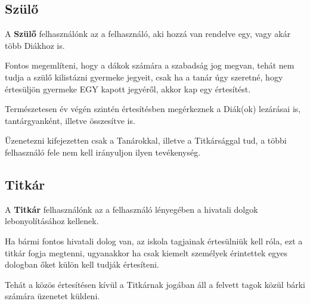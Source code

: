 \newpage
\subsection{Szülő}\label{subsec:RESZLETESLEIRAS:cel:szulo}
A {\bf Szülő} felhasználónk az a felhasználó, aki hozzá van rendelve egy, vagy akár több Diákhoz is.

Fontos megemlíteni, hogy a dákok számára a szabadság jog megvan, tehát nem tudja a szülő kilistázni gyermeke jegyeit, csak ha a tanár úgy szeretné, hogy értesüljön gyermeke EGY kapott jegyéről, akkor kap egy értesítést.

Természetesen év végén szintén értesítésben megérkeznek a Diák(ok) lezárásai is, tantárgyanként, illetve összesítve is.

Üzenetezni kifejezetten csak a Tanárokkal, illetve a Titkársággal tud, a többi felhasználó fele nem kell irányuljon ilyen tevékenység.

\subsection{Titkár}\label{subsec:RESZLETESLEIRAS:cel:titkar}
A {\bf Titkár} felhasználónk az a felhasználó lényegében a hivatali dolgok lebonyolításához kellenek.

Ha bármi fontos hivatali dolog van, az iskola tagjainak értesülniük kell róla, ezt a titkár fogja megtenni, ugyanakkor ha csak kiemelt személyek érintettek egyes dologban őket külön kell tudják értesíteni.

Tehát a közös értesítésen kívül a Titkárnak jogában áll a felvett tagok közül bárki számára üzenetet küldeni.

